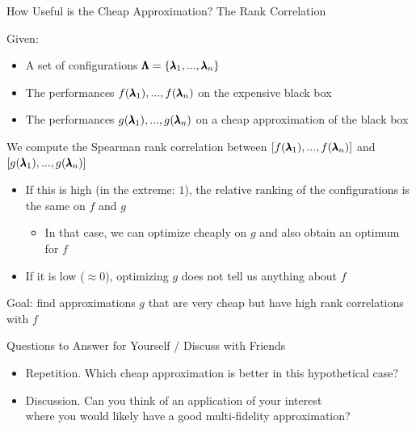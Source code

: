 \begin{frame}{How Useful is the Cheap Approximation? The Rank Correlation}

Given:
\begin{itemize}
    \item A set of configurations $\pmb{\Lambda} = \{\pmb{\lambda}_1, ..., \pmb{\lambda}_n\}$
    \item The performances $f(\pmb{\lambda}_1), ..., f(\pmb{\lambda}_n)$ on the expensive black box
    \item The performances $g(\pmb{\lambda}_1), ..., g(\pmb{\lambda}_n)$ on a cheap approximation of the black box

\bigskip
\pause

\end{itemize}
    We compute the \alert{Spearman rank correlation} between $[f(\pmb{\lambda}_1), ..., f(\pmb{\lambda}_n)]$ and $[g(\pmb{\lambda}_1), ..., g(\pmb{\lambda}_n)]$
\begin{itemize}    
    \item If this is high (in the extreme: $1$), the relative ranking of the configurations is the same on $f$ and $g$
    \begin{itemize}
        \item In that case, we can optimize cheaply on $g$ and also obtain an optimum for $f$
    \end{itemize}
    \item If it is low ($\approx 0$), optimizing $g$ does not tell us anything about $f$

\end{itemize}

\bigskip
\pause
\alert{Goal: find approximations $g$ that are very cheap but have high rank correlations with $f$}

\end{frame}

\begin{frame}{Questions to Answer for Yourself / Discuss with Friends}

\bigskip

\begin{itemize}
    \item \alert{Repetition.} Which cheap approximation is better in this hypothetical case?

\medskip
    \item \alert{Discussion.} 
    Can you think of an application of your interest \\ 
    where you would likely have a good multi-fidelity approximation?

\end{itemize}

\end{frame}

